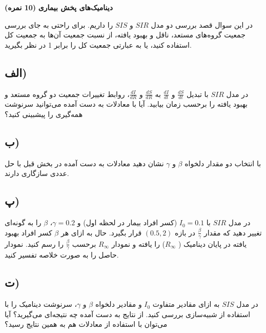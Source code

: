 \Large \textbf{دینامیک‌های پخش بیماری}
\large \textbf{(10 نمره)}

\normalsize \vspace{0.5cm}
در این سوال قصد بررسی دو مدل 
$SIR$ و $SIS$ را داریم. برای راحتی به جای بررسی جمعیت گروه‌های مستعد، ناقل و بهبود یافته، از نسبت جمعیت آن‌ها به جمعیت کل استفاده کنید، یا به عبارتی جمعیت کل را برابر 1 در نظر بگیرید.
\subsection*{الف)}
در مدل 
$SIR$ 
با تبدیل 
$\frac{dS}{dt}$ و $\frac{dI}{dt}$ به
$\frac{dS}{dR}$ و $\frac{dI}{dR}$، روابط تغییرات جمعیت دو گروه مستعد و بهبود یافته را برحسب زمان بیابید. آیا با معادلات به دست آمده می‌توانید سرنوشت همه‌گیری را پیشبینی کنید؟ 
\subsection*{ب)}
با انتخاب دو مقدار دلخواه 
$\beta$ و $\gamma$ نشان دهید معادلات به دست آمده در بخش قبل با حل عددی سازگاری دارند.

\subsection*{پ)}
در مدل 
$SIR$ 
با 
$I_0=0.1$ (کسر افراد بیمار در لحظه اول) و 
$\gamma=0.2$، 
$\beta$ را به گونه‌ای تغییر دهید که مقدار 
$\frac{\beta}{\gamma}$ در بازه 
$(0.5,2)$ قرار بگیرد. حال به ازای هر 
$\beta$ کسر افراد بهبود یافته در پایان دینامیک (
$R_{\infty}$) را یافته و نمودار 
$R_{\infty}$ برحسب 
$\frac{\beta}{\gamma}$ را رسم کنید. نمودار حاصل را به صورت خلاصه تفسیر کنید.
\subsection*{ت)}
در مدل 
$SIS$
به ازای مقادیر متفاوت 
$I_0$ و مقادیر دلخواه
$\beta$ و $\gamma$، سرنوشت دینامیک را با استفاده از شبیه‌سازی بررسی کنید. از 
نتایج به دست آمده چه نتیجه‌ای می‌گیرید؟
آیا می‌توان با استفاده از معادلات هم به همین نتایج رسید؟
